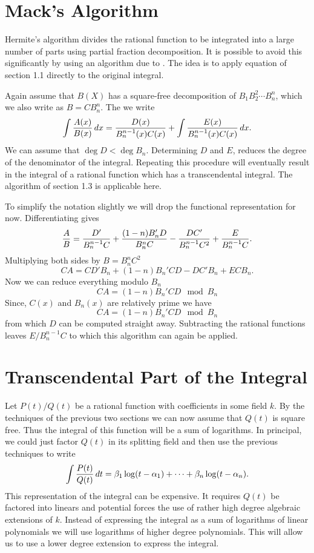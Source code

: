 \section{Mack's Algorithm}

Hermite's algorithm divides the rational function to be integrated
into a large number of parts using partial fraction decomposition.  It
is possible to avoid this significantly by using an algorithm due to
{\Mack} \cite{Mack:Integration}.  The idea is to apply equation
 of section 1.1 directly to the original integral.

Again assume that $B(X)$ has a square-free decomposition of $B_1 B_2^2
\cdots B_n^n$, which we also write as $B = C B_n^n$.  The we write
\begin{equation}\label{Int:Mack:PF:Eq}
\int {A(x) \over B(x)} \, dx = {D(x) \over B_n^{n-1}(x) C(x)}
+ \int {E(x) \over B_n^{n-1}(x) C(x)}\, dx.
\end{equation}
We can assume that $\deg D < \deg B_n$.  Determining $D$ and $E$,
reduces the degree of the denominator of the integral.  Repeating this
procedure will eventually result in the integral of a rational function
which has a transcendental integral.  The algorithm of section 1.3 is
applicable here.

To simplify the notation slightly we will drop the functional representation
for now.  Differentiating  gives
\[
{A \over B} =
  {D' \over B_n^{n-1} C} + {(1-n) B_n' D \over B_n^n C} -
  {D C' \over B_n^{n-1} C^2} + {E \over B_n^{n-1} C}.
\]
Multiplying both sides by $B = B_n^n C^2$
\[
CA = CD' B_n + (1-n) B_n' CD - D C' B_n + E CB_n.
\]
Now we can reduce everything modulo $B_n$
\[
CA = (1 - n) B_n' CD \mod{B_n}
\]
Since, $C(x)$ and $B_n(x)$ are relatively prime we have
\[
CA = (1 - n) B_n' CD \mod{B_n}
\]
from which $D$ can be computed straight away.  Subtracting the
rational functions leaves $E/B_n^{n-1}C$ to which this algorithm can
again be applied.

\section{Transcendental Part of the Integral}

Let $P(t)/Q(t)$ be a rational function with coefficients in some field $k$.
By the techniques of the previous two sections we can now assume that $Q(t)$
is square free.  Thus the integral of this function will be a sum of
logarithms.  In principal, we could just factor $Q(t)$ in its splitting
field and then use the previous techniques to write
\[
\int {P(t) \over Q(t)} \, dt = \beta_1 \log (t - \alpha_1) + \cdots +
\beta_n \log (t - \alpha_n).
\]
This representation of the integral can be expensive.  It requires $Q(t)$ be
factored into linears and potential forces the use of rather high degree
algebraic extensions of $k$.  Instead of expressing the integral as a sum of
logarithms of linear polynomials we will use logarithms of higher degree
polynomials.  This will allow us to use a lower degree extension to express
the integral.  

